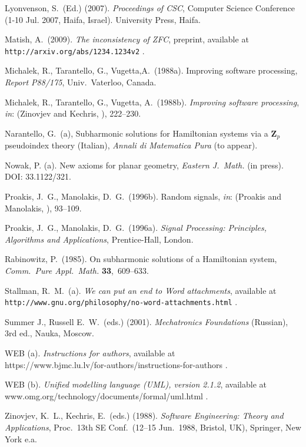 \documentclass{bjmc}   %
\begin{document}
\begin{thebibliography}{}
Lyonvenson, S.\ (Ed.) (2007). 
\textit{Proceedings of CSC},
Computer Science Conference (1-10 Jul. 2007, Haifa, Israel). University Press, Haifa.

Matish, A.\ (2009). 
\textit{The inconsistency of ZFC}, preprint, available at \\
\texttt{http://arxiv.org/abs/1234.1234v2} .

Michalek, R., Tarantello, G., Vugetta,A.\ (1988a).
Improving software processing,
\textit{Report P88/175}, Univ.\ Vaterloo, Canada.

Michalek, R., Tarantello, G., Vugetta, A.\ (1988b).
\textit{Improving software processing},
\textit{in}: (Zinovjev and Kechris, \cite{zin:kec}), 222--230.

Narantello, G.\ (a),
Subharmonic solutions for Hamiltonian systems via a $\mathbf{Z}_{p}$ pseudoindex theory (Italian),
\textit{Annali di Matematica Pura} (to appear).

Nowak, P. (a). New axioms for planar geometry, 
\textit{Eastern J.\ Math.} (in press). DOI: 33.1122/321.

Proakis, J.~G., Manolakis, D.~G.\ (1996b).
Random signals, \textit{in}: (Proakis and Manolakis, \cite{pro:man:a}), 93--109.

Proakis, J.~G., Manolakis, D.~G.\ (1996a).
\textit{Signal Processing: Principles, Algorithms and Applications}, 
Prentice-Hall, London.

Rabinowitz, P.\ (1985).
On subharmonic solutions of a Hamiltonian system,
\textit{Comm.\ Pure Appl.\ Math.} \textbf{33},~609--633. 

Stallman, R.~M.\ (a).
\textit{We can put an end to Word attachments}, available at \\
\texttt{http://www.gnu.org/philosophy/no-word-attachments.html} .

Summer J., Russell E.~W.\ (eds.) (2001). 
\textit{Mechatronics Foundations} (Russian), 3rd ed., Nauka, Moscow.

WEB (a). 
\textit{Instructions for authors}, available at  \\
{\ttfamily https://www.bjmc.lu.lv/for-authors/instructions-for-authors} .  

WEB (b). 
\textit{Unified modelling language (UML), version 2.1.2}, available at \\
{\ttfamily www.omg.org/technology/documents/formal/uml.html} .

Zinovjev, K.~L., Kechris, E.\ (eds.) (1988).
\textit{Software Engineering: Theory and Applications}, Proc.\ 13th SE Conf.\ (12--15 Jun.\ 1988, Bristol, UK), Springer, New York e.a.

\end{thebibliography}

%
\end{document}
